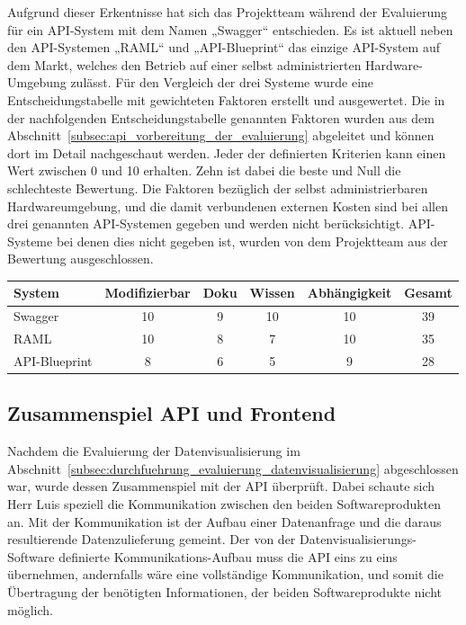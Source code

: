 Aufgrund dieser Erkentnisse hat sich das Projektteam während der Evaluierung
für ein \gls{API}\hyp{}System mit dem Namen „Swagger“ entschieden. Es ist
aktuell neben den \gls{API}\hyp{}Systemen „RAML“ und „API\hyp{}Blueprint“ das
einzige \gls{API}\hyp{}System auf dem Markt, welches den Betrieb auf einer
selbst administrierten Hardware\hyp{}Umgebung zulässt. Für den Vergleich der
drei Systeme wurde eine Entscheidungstabelle mit gewichteten Faktoren erstellt
und ausgewertet. Die in der nachfolgenden Entscheidungstabelle genannten
Faktoren wurden aus dem Abschnitt~\ref{subsec:api_vorbereitung_der_evaluierung}
abgeleitet und können dort im Detail nachgeschaut werden. Jeder der definierten
Kriterien kann einen Wert zwischen 0 und 10 erhalten. Zehn ist dabei die beste
und Null die schlechteste Bewertung. Die Faktoren bezüglich der selbst
administrierbaren Hardwareumgebung, und die damit verbundenen externen Kosten
sind bei allen drei genannten \gls{API}\hyp{}Systemen gegeben und werden nicht
berücksichtigt. \gls{API}\hyp{}Systeme bei denen dies nicht gegeben ist, wurden
von dem Projektteam aus der Bewertung ausgeschlossen.

\begin{center}
\begin{tabular}{lccccc}
  \toprule
  System           & Modifizierbar & Doku  & Wissen  & Abhängigkeit  & Gesamt \\
  \midrule
  Swagger             & 10            & 9     & 10      & 10            & 39 \\
  RAML                & 10            & 8     & 7       & 10            & 35 \\
  API\hyp{}Blueprint  & 8             & 6     & 5       & 9             & 28 \\
  \bottomrule
\end{tabular}
\end{center}
\nl%

\subsection{Zusammenspiel API und Frontend}
\label{subsec:zusammenspiel_api_frontend}
Nachdem die Evaluierung der Datenvisualisierung im
Abschnitt~\ref{subsec:durchfuehrung_evaluierung_datenvisualisierung}
abgeschlossen war, wurde dessen Zusammenspiel mit der \gls{API} überprüft.
Dabei schaute sich Herr Luis speziell die Kommunikation zwischen den beiden
Softwareprodukten an. Mit der Kommunikation ist der Aufbau einer Datenanfrage
und die daraus resultierende Datenzulieferung gemeint. Der von der
Datenvisualisierungs\hyp{}Software definierte Kommunikations\hyp{}Aufbau muss
die \gls{API} eins zu eins übernehmen, andernfalls wäre eine vollständige
Kommunikation, und somit die Übertragung der benötigten Informationen, der
beiden Softwareprodukte nicht möglich.

